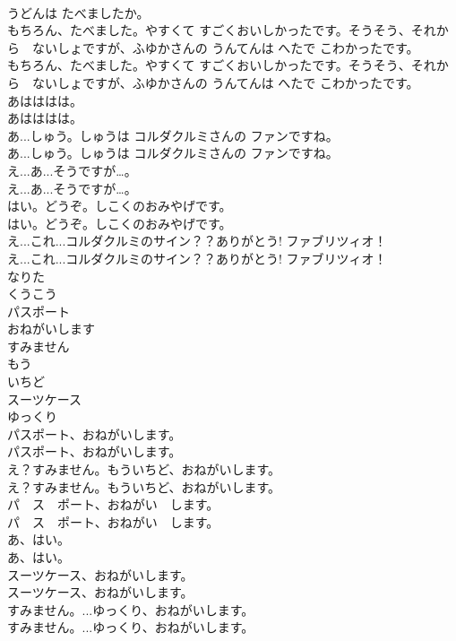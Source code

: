 \documentclass[8pt]{extreport}
\begin{document}
\begin{CJK}{UTF8}{min}
\\	うどんは たべましたか。 
\\	もちろん、たべました。やすくて すごくおいしかったです。そうそう、それから　ないしょですが、ふゆかさんの うんてんは へたで こわかったです。	
\\	もちろん、たべました。やすくて すごくおいしかったです。そうそう、それから　ないしょですが、ふゆかさんの うんてんは へたで こわかったです。 
\\	あはははは。	
\\	あはははは。 
\\	あ...しゅう。しゅうは コルダクルミさんの ファンですね。	
\\	あ...しゅう。しゅうは コルダクルミさんの ファンですね。 
\\	え...あ...そうですが…。	
\\	え...あ...そうですが…。 
\\	はい。どうぞ。しこくのおみやげです。	
\\	はい。どうぞ。しこくのおみやげです。 
\\	え...これ...コルダクルミのサイン？？ありがとう! ファブリツィオ！	
\\	え...これ...コルダクルミのサイン？？ありがとう! ファブリツィオ！ 
\\	なりた
\\	くうこう
\\	パスポート
\\	おねがいします
\\	すみません
\\	もう
\\	いちど
\\	スーツケース
\\	ゆっくり
\\	パスポート、おねがいします。	
\\	パスポート、おねがいします。 
\\	え？すみません。もういちど、おねがいします。	
\\	え？すみません。もういちど、おねがいします。 
\\	パ　ス　ポート、おねがい　します。	
\\	パ　ス　ポート、おねがい　します。 
\\	あ、はい。	
\\	あ、はい。 
\\	スーツケース、おねがいします。	
\\	スーツケース、おねがいします。 
\\	すみません。...ゆっくり、おねがいします。	
\\	すみません。...ゆっくり、おねがいします。 

\end{CJK}
\end{document}
